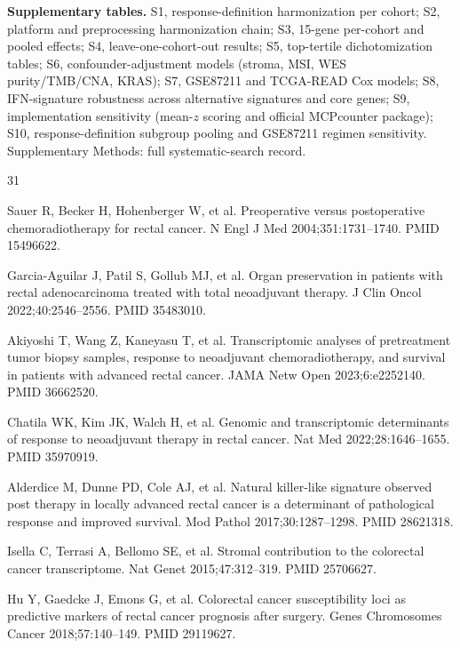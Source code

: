 \documentclass[11pt,a4paper]{article}
\begin{document}
\vspace{0.6em}
\noindent\textbf{Supplementary tables.} S1, response-definition harmonization per cohort; S2, platform and preprocessing harmonization chain; S3, 15-gene per-cohort and pooled effects; S4, leave-one-cohort-out results; S5, top-tertile dichotomization tables; S6, confounder-adjustment models (stroma, MSI, WES purity/TMB/CNA, KRAS); S7, GSE87211 and TCGA-READ Cox models; S8, IFN-signature robustness across alternative signatures and core genes; S9, implementation sensitivity (mean-$z$ scoring and official MCPcounter package); S10, response-definition subgroup pooling and GSE87211 regimen sensitivity. Supplementary Methods: full systematic-search record.

\begin{thebibliography}{31}
\small
\setlength{\itemsep}{1pt}

 Sauer R, Becker H, Hohenberger W, et al. Preoperative versus postoperative chemoradiotherapy for rectal cancer. N Engl J Med 2004;351:1731--1740. PMID 15496622.

 Garcia-Aguilar J, Patil S, Gollub MJ, et al. Organ preservation in patients with rectal adenocarcinoma treated with total neoadjuvant therapy. J Clin Oncol 2022;40:2546--2556. PMID 35483010.

 Akiyoshi T, Wang Z, Kaneyasu T, et al. Transcriptomic analyses of pretreatment tumor biopsy samples, response to neoadjuvant chemoradiotherapy, and survival in patients with advanced rectal cancer. JAMA Netw Open 2023;6:e2252140. PMID 36662520.

 Chatila WK, Kim JK, Walch H, et al. Genomic and transcriptomic determinants of response to neoadjuvant therapy in rectal cancer. Nat Med 2022;28:1646--1655. PMID 35970919.

 Alderdice M, Dunne PD, Cole AJ, et al. Natural killer-like signature observed post therapy in locally advanced rectal cancer is a determinant of pathological response and improved survival. Mod Pathol 2017;30:1287--1298. PMID 28621318.

 Isella C, Terrasi A, Bellomo SE, et al. Stromal contribution to the colorectal cancer transcriptome. Nat Genet 2015;47:312--319. PMID 25706627.

 Hu Y, Gaedcke J, Emons G, et al. Colorectal cancer susceptibility loci as predictive markers of rectal cancer prognosis after surgery. Genes Chromosomes Cancer 2018;57:140--149. PMID 29119627.


\end{thebibliography}
\end{document}
